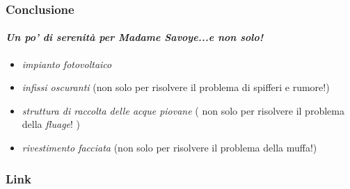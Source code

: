 \documentclass{beamer}
\begin{document}
\begin{frame}     

\frametitle{Conclusione}
\framesubtitle{\textit{Un po' di serenità per Madame Savoye...e non solo! }}
 
\begin{itemize}   
   \item<1-| alert@1> \emph{impianto fotovoltaico} 
   \item<2-| alert@2> \emph{infissi oscuranti} (non solo per risolvere il problema di spifferi e rumore!)
   \item<3-| alert@3> \emph{struttura di raccolta delle acque piovane} ( non solo per risolvere il problema della \emph{fluage}! )
   \item<4-| alert@4> \emph{rivestimento facciata} (non solo per risolvere il problema della muffa!)
    \end{itemize}

\end{frame}    

\begin{frame}
\frametitle{Link}


\small{
}
\vspace{2mm}
\end{frame}
\end{document}

